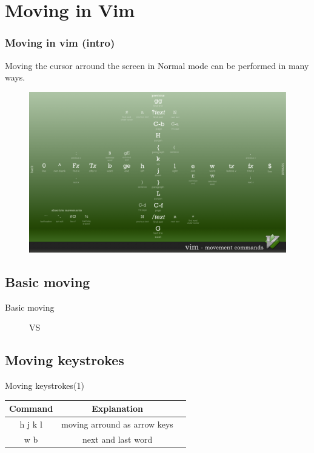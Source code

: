 \documentclass{beamer}
\begin{document}
  \section{Moving in Vim}
  \begin{frame}
    \frametitle{Moving in vim (intro)}
  Moving the cursor arround the screen in Normal mode can be performed in many ways. 
  \begin{figure}
      \includegraphics[width=0.8\linewidth]{movement.png}
    \end{figure}
  \end{frame}
  \subsection{Basic moving}
  \begin{frame}{Basic moving}
    \begin{figure}[htp] 
    \centering
    VS
    \end{figure}
  \end{frame}
  \subsection{Moving keystrokes}
  \begin{frame}{Moving keystrokes(1)}
\begin{center}
\begin{tabular}{ |c|c|c| } 
 \hline
 Command & Explanation \\ \hline
 h j k l & moving arround as arrow keys \\ \hline
 w b & next and last word  \\ \hline
\end{tabular}
\end{center}


      
  \end{frame}
    
\end{document}

